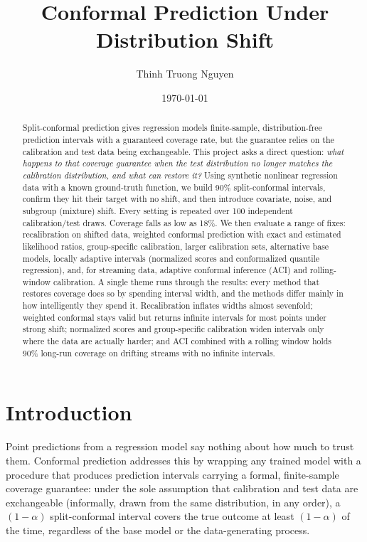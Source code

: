 \documentclass[11pt]{article}
\title{Conformal Prediction Under Distribution Shift}
\author{Thinh Truong Nguyen}
\date{\today}
\begin{document}
\maketitle

\begin{abstract}
Split-conformal prediction gives regression models finite-sample, distribution-free
prediction intervals with a guaranteed coverage rate, but the guarantee relies on the
calibration and test data being exchangeable. This project asks a direct question:
\emph{what happens to that coverage guarantee when the test distribution no longer
matches the calibration distribution, and what can restore it?} Using synthetic
nonlinear regression data with a known ground-truth function, we build 90\%
split-conformal intervals, confirm they hit their target with no shift, and then
introduce covariate, noise, and subgroup (mixture) shift. Every setting is repeated
over 100 independent calibration/test draws. Coverage falls as low as 18\%. We then
evaluate a range of fixes: recalibration on shifted data, weighted conformal
prediction with exact and estimated likelihood ratios, group-specific calibration,
larger calibration sets, alternative base models, locally adaptive intervals
(normalized scores and conformalized quantile regression), and, for streaming data,
adaptive conformal inference (ACI) and rolling-window calibration. A single theme runs
through the results: every method that restores coverage does so by spending interval
width, and the methods differ mainly in how intelligently they spend it. Recalibration
inflates widths almost sevenfold; weighted conformal stays valid but returns infinite
intervals for most points under strong shift; normalized scores and group-specific
calibration widen intervals only where the data are actually harder; and ACI combined
with a rolling window holds 90\% long-run coverage on drifting streams with no
infinite intervals.
\end{abstract}

\section{Introduction}

Point predictions from a regression model say nothing about how much to trust them.
Conformal prediction addresses this by wrapping any trained model with a procedure
that produces prediction intervals carrying a formal, finite-sample coverage
guarantee: under the sole assumption that calibration and test data are exchangeable
(informally, drawn from the same distribution, in any order), a $(1-\alpha)$
split-conformal interval covers the true outcome at least $(1-\alpha)$ of the time,
regardless of the base model or the data-generating process.
\end{document}
